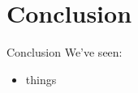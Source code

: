 \section{Conclusion}

\begin{frame}[c]{Conclusion}
    We've seen:
    \begin{itemize}[<+(1)->]
        \item things
    \end{itemize}
\end{frame}
